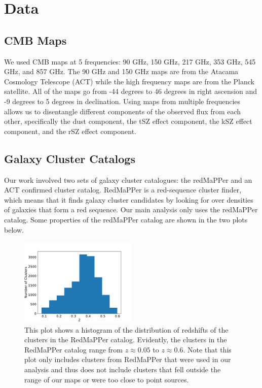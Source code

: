 \documentclass{princeton_astro_thesis}
\begin{document}
\chapter{Data}
\section{CMB Maps}
We used CMB maps at 5 frequencies: 90 GHz, 150 GHz, 217 GHz, 353 GHz, 545 GHz, and 857 GHz. The 90 GHz and 150 GHz maps are from the Atacama Cosmology Telescope (ACT) while the high frequency maps are from the Planck satellite. All of the maps go from -44 degrees to 46 degrees in right ascension and -9 degrees to 5 degrees in declination. Using maps from multiple frequencies allows us to disentangle different components of the observed flux from each other, specifically the dust component, the tSZ effect component, the kSZ effect component, and the rSZ effect component.
\section{Galaxy Cluster Catalogs}
Our work involved two sets of galaxy cluster catalogues: the redMaPPer and an ACT confirmed cluster catalog. RedMaPPer is a red-sequence cluster finder, which means that it finds galaxy cluster candidates by looking for over densities of galaxies that form a red sequence. Our main analysis only uses the redMaPPer catalog. Some properties of the redMaPPer catalog are shown in the two plots below.
\begin{figure}[h]
\centering
\includegraphics[width=0.5\textwidth]{../redmapper_z_hist.pdf}
\caption{This plot shows a histogram of the distribution of redshifts of the clusters in the RedMaPPer catalog. Evidently, the clusters in the RedMaPPer catalog range from $z\approx0.05$ to $z\approx0.6$. Note that this plot only includes clusters from RedMaPPer that were used in our analysis and thus does not include clusters that fell outside the range of our maps or were too close to point sources. }
\end{figure}
\end{document}
